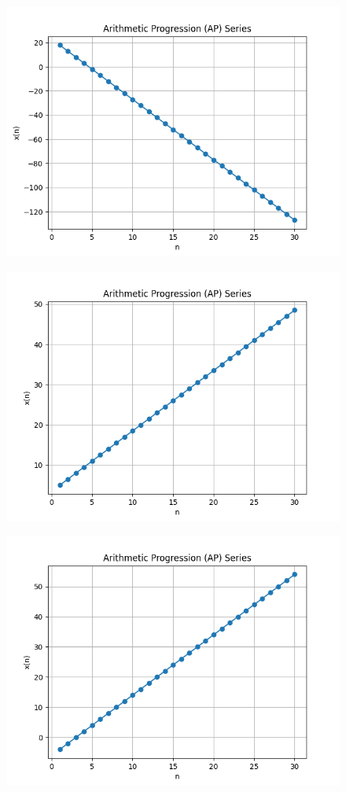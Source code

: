 \documentclass[journal,12pt,twocolumn]{IEEEtran}
\theoremstyle{remark}
\begin{document}
\begin{figure}[h]
      \vspace*{-1cm}
      \centering
       \includegraphics[width=0.8\linewidth]{figures/download2.png} %
        \caption{}
    \end{figure}
    
\begin{figure}[h]
      \vspace*{-2cm}
      \centering
       \includegraphics[width=0.8\linewidth]{figures/download3.png} %
        \caption{}
    \end{figure}
    
\begin{figure}[h]
      \vspace*{-2cm} 
      \centering
       \includegraphics[width=0.8\linewidth]{figures/download4.png} %
        \caption{}
    \end{figure}
    
\end{document}
